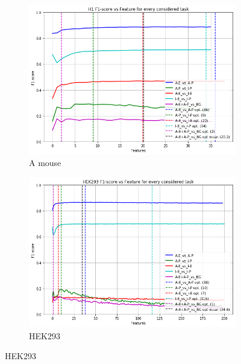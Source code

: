 \begin{figure}[!htb]
\begin{subfigure}[b]{0.48\textwidth}
        \includegraphics[width=\textwidth]{images/features_plots/H1_feature_plot.png}
        \caption{A mouse}
        \label{fig:H1_n_feat}
    \end{subfigure}
    \begin{subfigure}[b]{0.48\textwidth}
        \includegraphics[width=\textwidth]{images/features_plots/HEK293_feature_plot.png}
        \caption{HEK293}
        \label{fig:HEK293_n_feat}
    \end{subfigure}
    

\end{figure}
